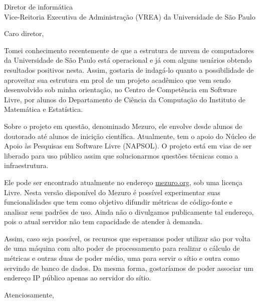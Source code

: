 \documentclass[a4paper,11pt]{letter}
\begin{document}
\begin{letter}{ Diretor de informática \\ Vice-Reitoria Executiva de Administração (VREA) da Universidade de São Paulo}

\opening{ Caro diretor, }

Tomei conhecimento recentemente de que a estrutura de nuvem de computadores da Universidade de São Paulo está operacional e já com alguns usuários obtendo resultados positivos nesta. Assim, gostaria de indagá-lo quanto a possibilidade de aproveitar sua estrutura em prol de um projeto acadêmico que vem sendo desenvolvido sob minha orientação, no Centro de Competência em Software Livre, por alunos do Departamento de Ciência da Computação do Instituto de Matemática e Estatística.

Sobre o projeto em questão, denominado Mezuro, ele envolve desde alunos de doutorado até alunos de inicição científica. Atualmente, tem o apoio do Núcleo de Apoio às Pesquisas em Software Livre (NAPSOL). O projeto está em vias de ser liberado para uso público assim que solucionarmos questões técnicas como a infraestrutura.

Ele pode ser encontrado atualmente no endereço \url{mezuro.org}, sob uma licença Livre. Nesta versão disponível do Mezuro é possível experimentar suas funcionalidades que tem como objetivo difundir métricas de código-fonte e analisar seus padrões de uso. Ainda não o divulgamos publicamente tal endereço, pois o atual servidor não tem capacidade de atender à demanda.

Assim, caso seja possível, os recursos que esperamos poder utilizar são por volta de uma máquina com alto poder de processamento para realizar o cálculo de métricas e outras duas de poder médio, uma para servir o sítio e outra como servindo de banco de dados. Da mesma forma, gostaríamos de poder associar um endereço IP público apenas ao servidor do sítio.

\closing{Atenciosamente,}

\end{letter}
\end{document}
